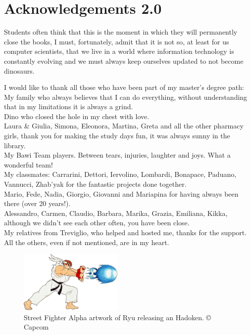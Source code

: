 \chapter*{Acknowledgements 2.0}

Students often think that this is the moment in which they will permanently close the books, I must, fortunately, admit that it is not so, at least for us computer scientists, that we live in a world where information technology is constantly evolving and we must always keep ourselves updated to not become dinosaurs.

I would like to thank all those who have been part of my master's degree path:\\
My family who always believes that I can do everything, without understanding that in my limitations it is always a grind.\\
Dino who closed the hole in my chest with love.\\
Laura \& Giulia, Simona, Eleonora, Martina, Greta and all the other pharmacy girls, thank you for making the study days fun, it was always sunny in the library.\\
My Bawi Team players. Between tears, injuries, laughter and joys. What a wonderful team!\\
My classmates: Carrarini, Dettori, Iervolino, Lombardi, Bonapace, Paduano, Vannucci, Zhab'yak for the fantastic projects done together.\\
Mario, Fede, Nadia, Giorgio, Giovanni and Mariapina for having always been there (over 20 years!).\\
Alessandro, Carmen, Claudio, Barbara, Marika, Grazia, Emiliana, Kikka, although we didn't see each other often, you have been close.\\
My relatives from Treviglio, who helped and hosted me, thanks for the support.\\
All the others, even if not mentioned, are in my heart.

\vspace*{\fill}

\begin{figure}[H]
	\centering
	\includegraphics[width=5cm]{immagini/hadoken}
	\caption{Street Fighter Alpha artwork of Ryu releasing an Hadoken. © Capcom}
	\label{fig:hadoken}
\end{figure}